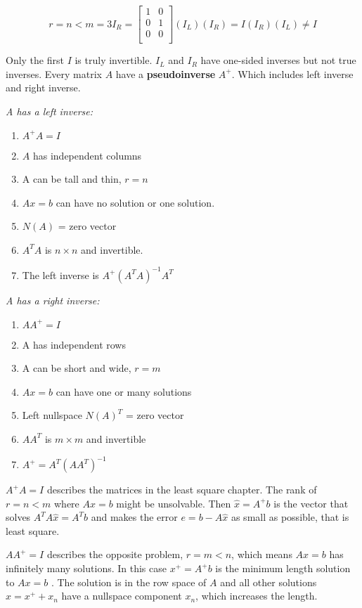 \[
    r = n < m = 3
    I_R = 
    \begin{bmatrix}
        1 & 0 \\
        0 & 1  \\
        0 & 0  \\
    \end{bmatrix}
    (I_L)(I_R) = I 
    (I_R)(I_L) \neq I
\] 

Only the first \(I\) is truly invertible. \(I_L\) and \(I_R\) have one-sided inverses but not true inverses. Every matrix \(A\) have a \textbf{pseudoinverse} \(A^+\). Which includes left inverse and right inverse. 

\emph{A has a left inverse:}
\begin{enumerate}
    \item \(A^+ A = I \) 
    \item \(A\) has independent columns 
    \item A can be tall and thin, \(r = n\)
    \item \(Ax = b\) can have no solution or one solution. 
    \item \(N(A)\) = zero vector 
    \item \(A^T A\) is \(n \times n\) and invertible. 
    \item The left inverse is \(A^+ (A^T A)^{-1} A^T \)      
\end{enumerate}

\emph{A has a right inverse:}
\begin{enumerate}
    \item \(A A^+ = I\)
    \item A has independent rows 
    \item A can be short and wide, \(r = m\)
    \item \(Ax = b\) can have one or many solutions 
    \item Left nullspace \(N(A)^T\) = zero vector 
    \item \(A A^T\) is \(m \times m\) and invertible 
    \item \(A^+ = A^T (A A^T)^{-1} \)      
\end{enumerate}

\(A^+ A = I\) describes the matrices in the least square chapter. The rank of \(r = n < m\) where \(Ax = b\) might be unsolvable. Then \(\hat{x} = A^+ b\) is the vector that solves \(A^T A\hat{x} = A^T b\) and makes the error \(e = b - A\hat{x}\) as small as possible, that is least square. 

\(A A^+ = I\) describes the opposite problem, \(r = m < n\), which means \(Ax = b\) has infinitely many solutions. In this case \(x^+ = A^+ b\) is the minimum length solution to \(Ax = b\) . The solution is in the row space of \(A\) and all other solutions \(x = x^+ + x_n\) have a nullspace component \(x_n\), which increases the length. 

